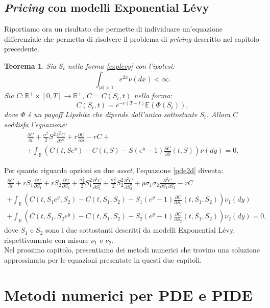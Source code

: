\documentclass[a4paper,10pt]{report}
\newcommand{\der}[2]{\frac{\partial #1}{\partial #2}}
\newcommand{\dder}[2]{\frac{\partial^2 #1}{\partial #2^2}}
\newcommand{\dmix}[3]{\frac{\partial^2 #1}{\partial #2 \partial #3}}
\newtheorem{theorem}{Teorema}[chapter]
\theoremstyle{osservazione}
\theoremstyle{esempio}
\theoremstyle{notazione}
\theoremstyle{corollario}
\begin{document}
\section{\emph{Pricing} con modelli Exponential L\'evy}
Riportiamo ora un risultato che permette di individuare un'equazione differenziale che permetta di risolvere il problema di \emph{pricing} descritto nel capitolo precedente.
\begin{theorem}
Sia $S_t$ nella forma \ref{explevy} con l'ipotesi: $$\int_{|x|>1} e^{2x}\nu(dx)<\infty.$$ Sia $C:\mathbb{R}^+\times[0,T]\rightarrow\mathbb{R}^+$, $C=C(S_t,t)$ nella forma: $$C(S_t,t)=e^{-r(T-t)}\mathbb{E}(\Phi(S_t)),$$ dove $\Phi$ \`e un \emph{payoff Lipshitz} che dipende dall'unico sottostante $S_t$. Allora $C$ soddisfa l'equazione:
\begin{multline}
\der{C}{t}+\frac{\sigma^2}{2}S^2\dder{C}{S}+r\der{C}{S}-rC+\\+ \int_\mathbb{R}\left(C(t,Se^y)-C(t,S)-S(e^y-1)\der{C}{S}(t,S)\right)\nu(dy)=0.
\end{multline}
\end{theorem}
Per quanto riguarda opzioni su due \emph{asset}, l'equazione \ref{pde2d} diventa:
\begin{multline}
\der{C}{t}+rS_1\der{C}{S_1}+rS_2\der{C}{S_2}+\frac{\sigma^2_1}{2}S_1^2\dder{C}{S_1}+\frac{\sigma^2_2}{2}S_2^2\dder{C}{S_2}+\rho\sigma_1\sigma_2\dmix{C}{S_1}{S_2}-rC\\+\int_\mathbb{R}\left(C(t,S_1e^y,S_2)-C(t,S_1,S_2)-S_1(e^y-1)\der{C}{S_1}(t,S_1,S_2)\right)\nu_1(dy)\\+\int_\mathbb{R}\left(C(t,S_1,S_2e^y)-C(t,S_1,S_2)-S_2(e^y-1)\der{C}{S_2}(t,S_1,S_2)\right)\nu_2(dy)=0,
\label{pide2d}
\end{multline}
dove $S_1$ e $S_2$ sono i due sottostanti descritti da modelli Exponential L\'evy, rispettivamente con misure $\nu_1$ e $\nu_2$.\\Nel prossimo capitolo, presentiamo dei metodi numerici che trovino una soluzione approssimata per le equazioni presentate in questi due capitoli.

\chapter{Metodi numerici per PDE e PIDE}
\end{document}
